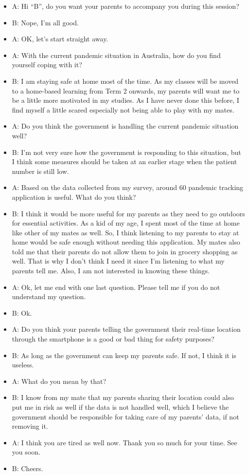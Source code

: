   \begin{itemize}
    \item A: Hi “B”, do you want your parents to accompany you during this session?
    \item B: Nope, I’m all good.
    \item A: OK, let’s start straight away.
    \item A: With the current pandemic situation in Australia, how do you find yourself coping with it?
    \item B: I am staying safe at home most of the time. As my classes will be moved to a home-based
learning from Term 2 onwards, my parents will want me to be a little more motivated in my
studies. As I have never done this before, I find myself a little scared especially not being able to
play with my mates.
    \item A: Do you think the government is handling the current pandemic situation well?
    \item B: I’m not very sure how the government is responding to this situation, but I think some
measures should be taken at an earlier stage when the patient number is still low.
    \item A: Based on the data collected from my survey, around 60%
pandemic tracking application is useful. What do you think?
    \item B: I think it would be more useful for my parents as they need to go outdoors for essential
activities. As a kid of my age, I spent most of the time at home like other of my mates as well. So,
I think listening to my parents to stay at home would be safe enough without needing this
application. My mates also told me that their parents do not allow them to join in grocery
shopping as well. That is why I don’t think I need it since I’m listening to what my parents
tell me. Also, I am not interested in knowing these things.
    \item A: Ok, let me end with one last question. Please tell me if you do not understand my question.
    \item B: Ok.
    \item A: Do you think your parents telling the government their real-time location through the
smartphone is a good or bad thing for safety purposes?
    \item B: As long as the government can keep my parents safe. If not, I think it is useless.
    \item A: What do you mean by that?
    \item B: I know from my mate that my parents sharing their location could also put me in risk as well
if the data is not handled well, which I believe the government should be responsible for taking
care of my parents' data, if not removing it.
    \item A: I think you are tired as well now. Thank you so much for your time. See you soon.
    \item B: Cheers.
  \end{itemize}


